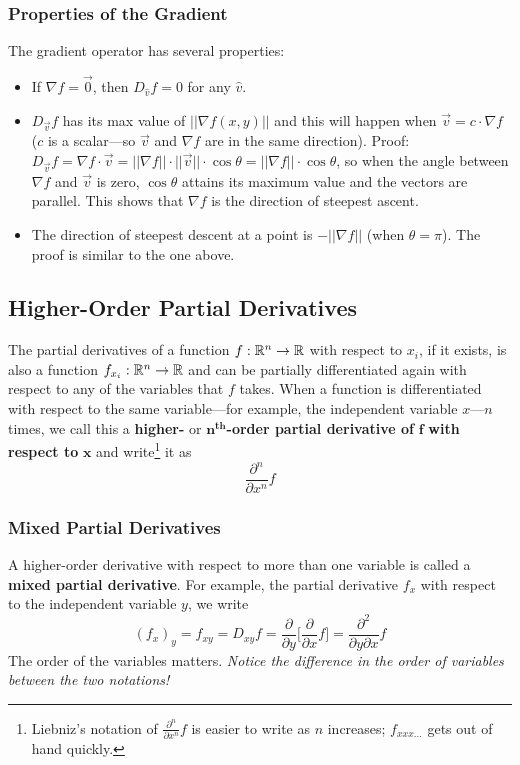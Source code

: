 \subsubsection{Properties of the Gradient} The gradient operator has several properties: \begin{itemize}
\item If $\nabla f = \vec{0}$, then $D_{\hat{v}}f = 0$ for any $\hat{v}$.
\item $D_{\vec{v}}f$ has its max value of $||\nabla f(x,y)||$ and this will happen when $\vec{v}=c \cdot \nabla f$ ($c$ is a scalar—so $\vec{v}$ and $\nabla f$ are in the same direction). Proof: $D_{\vec{v}}f = \nabla f \cdot \vec{v} = || \nabla f || \cdot || \vec{v} || \cdot \cos{\theta} = || \nabla f || \cdot \cos{\theta}$, so when the angle between $\nabla f$ and $\vec{v}$ is zero, $\cos{\theta}$ attains its maximum value and the vectors are parallel. This shows that $\nabla f$ is the direction of steepest ascent.
\item The direction of steepest descent at a point is $-||\nabla f||$ (when $\theta = \pi$). The proof is similar to the one above.
\end{itemize}

\subsection{Higher-Order Partial Derivatives}

The partial derivatives of a function $f: \mathbb{R}^n \to \mathbb{R}$ with respect to $x_i$, if it exists, is also a function $f_{x_i}: \mathbb{R}^n \to \mathbb{R}$ and can be partially differentiated again with respect to any of the variables that $f$ takes. When a function is differentiated with respect to the same variable—for example, the independent variable $x$—$n$ times, we call this a \textbf{higher-} or $\mathbf{n^{th}}$\textbf{-order partial derivative of} $\mathbf{f}$ \textbf{with respect to} $\mathbf{x}$ and write\footnote{Liebniz's notation of $\frac{\partial^{n}}{\partial x^n} f$  is easier to write as $n$ increases; $f_{xxx \ldots}$ gets out of hand quickly.} it as $$\frac{\partial^n}{\partial x^n} f$$

\subsubsection{Mixed Partial Derivatives}

A higher-order derivative with respect to more than one variable is called a \textbf{mixed partial derivative}. For example, the partial derivative $f_x$ with respect to the independent variable $y$, we write $$(f_x)_y = f_{xy} = D_{xy} f = \frac{\partial}{\partial y} \Big[ \frac{\partial}{\partial x} f \Big] = \frac{\partial^{2}}{\partial y \partial x} f$$ The order of the variables matters. \textit{Notice the difference in the order of variables between the two notations!}

